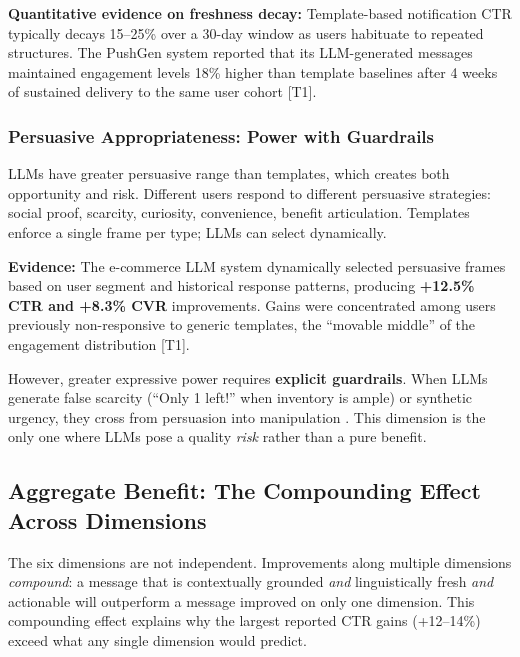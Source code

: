 \documentclass[11pt]{article}
\begin{document}
\textbf{Quantitative evidence on freshness decay:} Template-based notification CTR typically decays 15--25\% over a 30-day window as users habituate to repeated structures. The PushGen system reported that its LLM-generated messages maintained engagement levels 18\% higher than template baselines after 4 weeks of sustained delivery to the same user cohort \citep{bie2026pushgen} [T1].

\subsubsection{Persuasive Appropriateness: Power with Guardrails}

LLMs have greater persuasive range than templates, which creates both opportunity and risk. Different users respond to different persuasive strategies: social proof, scarcity, curiosity, convenience, benefit articulation. Templates enforce a single frame per type; LLMs can select dynamically.

\textbf{Evidence:} The e-commerce LLM system dynamically selected persuasive frames based on user segment and historical response patterns, producing \textbf{+12.5\% CTR and +8.3\% CVR} improvements. Gains were concentrated among users previously non-responsive to generic templates, the ``movable middle'' of the engagement distribution \citep{acm2025ecommerce} [T1].

However, greater expressive power requires \textbf{explicit guardrails}. When LLMs generate false scarcity (``Only 1 left!'' when inventory is ample) or synthetic urgency, they cross from persuasion into manipulation \citep{susser2019technology}. This dimension is the only one where LLMs pose a quality \textit{risk} rather than a pure benefit.

\subsection{Aggregate Benefit: The Compounding Effect Across Dimensions}

The six dimensions are not independent. Improvements along multiple dimensions \textit{compound}: a message that is contextually grounded \textit{and} linguistically fresh \textit{and} actionable will outperform a message improved on only one dimension. This compounding effect explains why the largest reported CTR gains (+12--14\%) exceed what any single dimension would predict.
\end{document}

